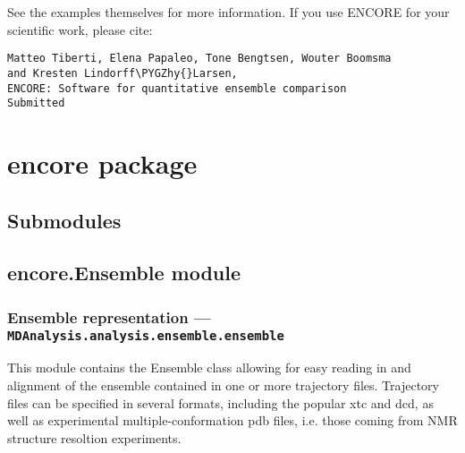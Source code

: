 \documentclass[letterpaper,10pt,english]{sphinxmanual}
\def\PYGZhy{\char`\-}
\begin{document}
See the examples themselves for more information.
If you use ENCORE for your scientific work, please cite:

\begin{Verbatim}[frame=single,commandchars=\\\{\}]
Matteo Tiberti, Elena Papaleo, Tone Bengtsen, Wouter Boomsma
and Kresten Lindorff\PYGZhy{}Larsen,
ENCORE: Software for quantitative ensemble comparison
Submitted
\end{Verbatim}


\chapter{encore package}
\label{index:encore-package}

\section{Submodules}
\label{index:submodules}

\section{encore.Ensemble module}
\label{index:module-encore.Ensemble}\label{index:encore-ensemble-module}

\subsection{Ensemble representation --- \texttt{MDAnalysis.analysis.ensemble.ensemble}}
\label{index:ensemble-representation-mdanalysis-analysis-ensemble-ensemble}
This module contains the Ensemble class allowing for easy reading in 
and alignment of the ensemble contained in one or more trajectory files.
Trajectory files can be specified in several formats, including the popular
xtc and dcd, as well as experimental multiple-conformation pdb files, i.e.
those coming from NMR structure resoltion experiments.
\end{document}
